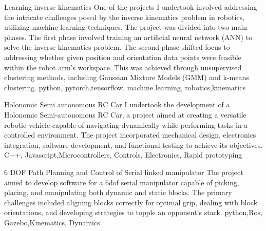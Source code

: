 %
%
%


\begin{projects}
	\project
	{Learning inverse kinematics}{}
	{  }
	{One of the projects I undertook involved addressing the intricate challenges posed by the inverse kinematics problem in robotics, utilizing machine learning techniques. The project was divided into two main phases. The first phase involved training an artificial neural network (ANN) to solve the inverse kinematics problem. The second phase shifted focus to addressing whether given position and orientation data points were feasible within the robot arm's workspace. This was achieved through unsupervised clustering methods, including Gaussian Mixture Models (GMM) and k-means clustering. }
	{python, pytorch,tensorflow, machine learning, robotics,kinematics}
	
	\project		
	{Holonomic Semi autonomous RC Car}{}
	{  }
	{I undertook the development of a Holonomic Semi-autonomous RC Car, a project aimed at creating a versatile robotic vehicle capable of navigating dynamically while performing tasks in a controlled environment. The project incorporated mechanical design, electronics integration, software development, and functional testing to achieve its objectives.}
	{C++, Javascript,Microcontrollers, Controls, Electronics, Rapid prototyping}
	
	\project		
	{6 DOF Path Planning and Control  of Serial linked manipulator}{}
	{  }
	{The project aimed to develop software for a 6dof serial manipulator capable of picking, placing, and manipulating both dynamic and static blocks. The primary challenges included aligning blocks correctly for optimal grip, dealing with block orientations, and developing strategies to topple an opponent's stack.}
	{python,Ros, Gazebo,Kinematics, Dynamics}
	
\end{projects}